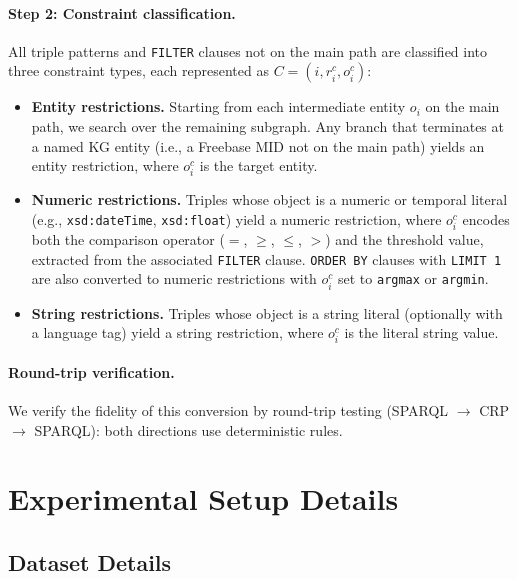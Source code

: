\documentclass[11pt]{article}
\begin{document}
\paragraph{Step 2: Constraint classification.}
All triple patterns and \texttt{FILTER} clauses not on the main path are
classified into three constraint types, each represented as
$C=(i, r_i^c, o_i^c)$:

\begin{itemize}
  \item \textbf{Entity restrictions.} Starting from each intermediate
    entity $o_i$ on the main path, we search over the remaining subgraph.
    Any branch that terminates at a named KG entity (i.e., a Freebase MID
    not on the main path) yields an entity restriction, where $o_i^c$ is
    the target entity.

  \item \textbf{Numeric restrictions.} Triples whose object is a numeric
    or temporal literal (e.g., \texttt{xsd:dateTime}, \texttt{xsd:float})
    yield a numeric restriction, where $o_i^c$ encodes both the comparison
    operator ($=$, $\geq$, $\leq$, $>$) and the threshold value, extracted
    from the associated \texttt{FILTER} clause. \texttt{ORDER BY} clauses
    with \texttt{LIMIT~1} are also converted to numeric restrictions with
    $o_i^c$ set to \texttt{argmax} or \texttt{argmin}.

  \item \textbf{String restrictions.} Triples whose object is a string
    literal (optionally with a language tag) yield a string restriction,
    where $o_i^c$ is the literal string value.
\end{itemize}

\paragraph{Round-trip verification.}
We verify the fidelity of this conversion by round-trip testing
(SPARQL $\to$ CRP $\to$ SPARQL): both directions use deterministic rules.

\section{Experimental Setup Details}
\label{app:experiment_setup}

\subsection{Dataset Details}
\label{app:dataset_details}
\end{document}
